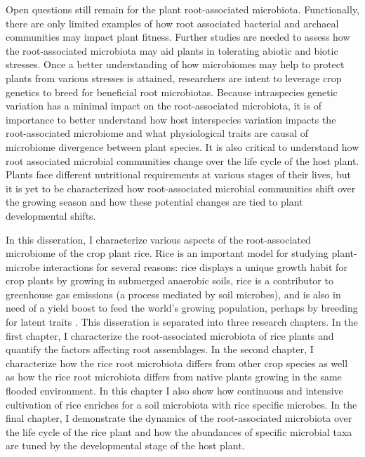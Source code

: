 Open questions still remain for the plant root-associated microbiota. Functionally, there are only limited examples of how root associated bacterial and archaeal communities may impact plant fitness. Further studies are needed to assess how the root-associated microbiota may aid plants in tolerating abiotic and biotic stresses. Once a better understanding of how microbiomes may help to protect plants from various stresses is attained, researchers are intent to leverage crop genetics to breed for beneficial root microbiotas. Because intraspecies genetic variation has a minimal impact on the root-associated microbiota, it is of importance to better understand how host interspecies variation impacts the root-associated microbiome and what physiological traits are causal of microbiome divergence between plant species. It is also critical to understand how root associated microbial communities change over the life cycle of the host plant. Plants face different nutritional requirements at various stages of their lives, but it is yet to be characterized how root-associated microbial communities shift over the growing season and how these potential changes are tied to plant developmental shifts. 

In this disseration, I characterize various aspects of the root-associated microbiome of the crop plant rice. Rice is an important model for studying plant-microbe interactions for several reasons: rice displays a unique growth habit for crop plants by growing in submerged anaerobic soils, rice is a contributor to greenhouse gas emissions \cite{Minami1994} (a process mediated by soil microbes), and is also in need of a yield boost to feed the world's growing population, perhaps by breeding for latent traits \cite{khush2005will}. This disseration is separated into three research chapters. In the first chapter, I characterize the root-associated microbiota of rice plants and quantify the factors affecting root assemblages. In the second chapter, I characterize how the rice root microbiota differs from other crop species as well as how the rice root microbiota differs from native plants growing in the same flooded environment. In this chapter I also show how continuous and intensive cultivation of rice enriches for a soil microbiota with rice specific microbes. In the final chapter, I demonstrate the dynamics of the root-associated microbiota over the life cycle of the rice plant and how the abundances of specific microbial taxa are tuned by the developmental stage of the host plant.
